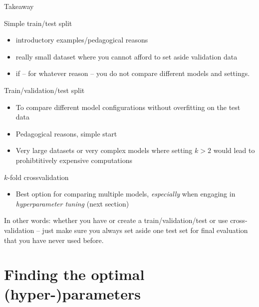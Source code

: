\documentclass[compress]{beamer}
\begin{document}
\begin{frame}[allowframebreaks]{Takeaway}

\begin{block}{Simple train/test split}
\begin{itemize}
	\item introductory examples/pedagogical reasons
	\item really small dataset where you cannot afford to set aside validation data
	\item if -- for whatever reason -- you do not compare different models and settings.
\end{itemize}
\end{block}

\framebreak

\begin{block}{Train/validation/test split}
	\begin{itemize}
		\item To compare different model configurations without overfitting on the test data
		\item Pedagogical reasons, simple start
		\item Very large datasets or very complex models where setting $k>2$ would lead to prohibtitively expensive computations
	\end{itemize}
\end{block}

\framebreak

\begin{block}{$k$-fold crossvalidation}
	\begin{itemize}
		\item Best option for comparing multiple models, \emph{especially} when engaging in \emph{hyperparameter tuning} (next section)
	\end{itemize}
\end{block}

\end{frame}



\begin{frame}[standout]
In other words: whether you have or create a train/validation/test or use cross-validation -- just make sure you always set aside one test set for final evaluation that you have never used before.
\end{frame}





\section{Finding the optimal (hyper-)parameters}
\end{document}
